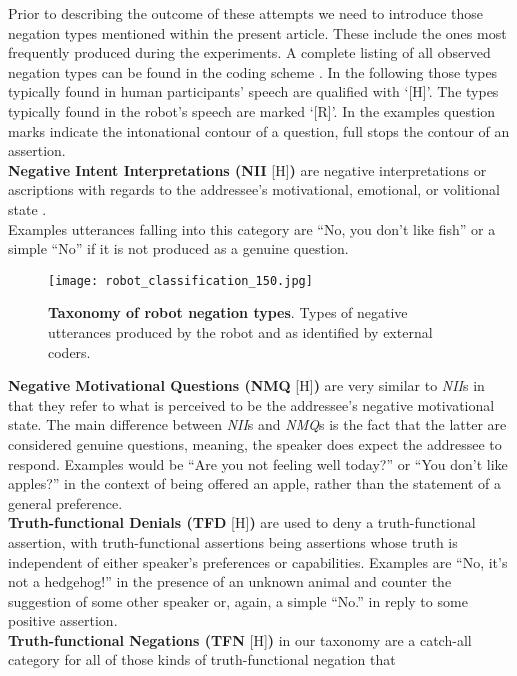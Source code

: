 Prior to describing the outcome of these attempts we need to introduce those negation types mentioned within the present article. These include the ones most frequently
produced during the experiments. A complete listing of all observed negation types can be found in the coding scheme \cite{Foerster2018}. 
In the following those types typically found in human participants' speech are qualified with `[H]'. The types typically found in the robot's speech are 
marked `[R]'. In the examples question marks indicate the intonational contour of a question, full stops the contour of an assertion.\\
\textbf{Negative Intent Interpretations (NII} [H]\textbf{)} are negative interpretations or ascriptions with regards to the addressee's motivational, emotional,
or volitional state \cite[p. 179]{Pea1980}.\\
Examples utterances falling into this category are ``No, you don't like fish'' or a simple ``No'' if it is not produced as a genuine question.\\
\begin{figure}
  \begin{center}
    \centerline{\texttt{[image: robot\_classification\_150.jpg]}}
  \end{center}
  \caption{\textbf{Taxonomy of robot negation types}. Types of negative utterances produced by the robot and as identified by external coders.}
  \label{robot_neg_types}
\end{figure}
\textbf{Negative Motivational Questions (NMQ} [H]\textbf{)} are very similar to \emph{NII}s in that they refer to what is perceived to be the addressee's
negative motivational state. The main difference between \emph{NII}s and \emph{NMQ}s is the fact that the latter are considered genuine questions, meaning, the
speaker does expect the addressee to respond. Examples would be ``Are you not feeling well today?'' or ``You don't like apples?'' in the context of being
offered an apple, rather than the statement of a general preference.\\
\textbf{Truth-functional Denials (TFD} [H]\textbf{)} are used to deny a truth-functional assertion, with truth-functional assertions being assertions whose truth is
independent of either speaker's preferences or capabilities. Examples are ``No, it's not a hedgehog!'' in the presence of an unknown animal and counter the suggestion
of some other speaker or, again, a simple ``No.'' in reply to some positive assertion.\\
\textbf{Truth-functional Negations (TFN} [H]\textbf{)} in our taxonomy are a catch-all category for all of those kinds of truth-functional negation that
